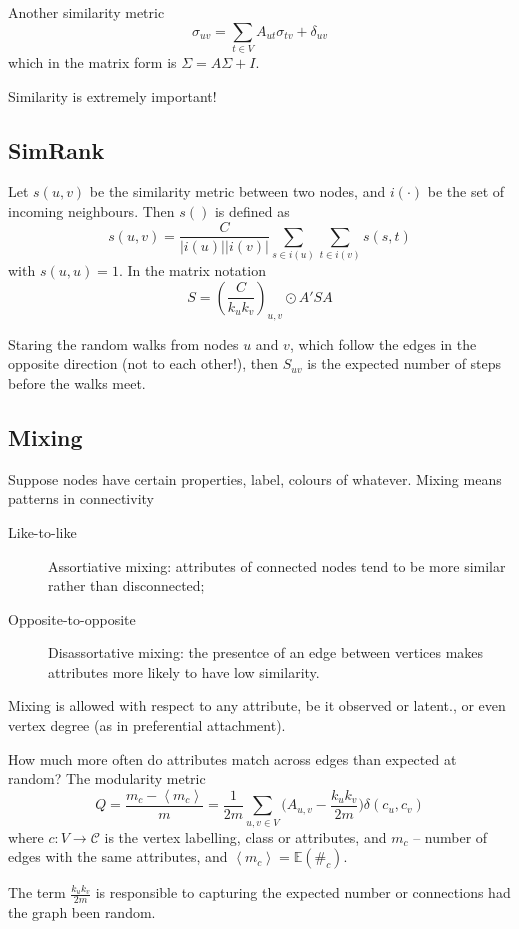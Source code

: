 \documentclass[a4paper]{article}
\newcommand{\brac}[1]{{\left ( #1 \right )}}
\newcommand{\abs}[1]{{\left | #1 \right |}}
\newcommand{\brkt}[1]{{\left\langle #1 \right\rangle}}
\newcommand{\ex}{\mathbb{E}}
\begin{document}
Another similarity metric
\[\sigma_{uv} = \sum_{t\in V} A_{ut}\sigma_{tv} + \delta_{uv}\]
which in the matrix form is $\Sigma = A \Sigma + I$.

Similarity is extremely important!

\subsection{SimRank} %
\label{sub:simrank}
Let $s(u,v)$ be the similarity metric between two nodes, and $i(\cdot)$ be the set of incoming neighbours. Then $s()$ is defined as 
\[ s(u,v) = \frac{C}{\abs{i(u)}\abs{i(v)}} \sum_{s\in i(u)} \sum_{t\in i(v)} s(s,t)\]
with $s(u,u)=1$. In the matrix notation
\[ S = \brac{\frac{C}{k_u k_v}}_{u,v}\odot A' S A\]

Staring the random walks from nodes $u$ and $v$, which follow the edges in the opposite direction (not to each other!), then $S_{uv}$ is the expected number of steps before the walks meet.


\subsection{Mixing} %
\label{sub:mixing}

Suppose nodes have certain properties, label, colours of whatever.
Mixing means patterns in connectivity
\begin{description}
	\item[Like-to-like] Assortiative mixing: attributes of connected nodes tend to be more similar rather than disconnected;
	\item[Opposite-to-opposite] Disassortative mixing: the presentce of an edge between vertices makes attributes more likely to have low similarity.
\end{description}

Mixing is allowed with respect to any attribute, be it observed or latent., or even vertex degree (as in preferential attachment).

How much more often do attributes match across edges than expected at random? The modularity metric
\[ Q = \frac{m_c-\brkt{m_c}}{m} = \frac{1}{2m}\sum_{u,v\in V} \Big( A_{u,v} - \frac{k_u k_v}{2m} \Big) \delta(c_u,c_v)\]
where $c:V\to \mathcal{C}$ is the vertex labelling, class or attributes, and $m_c$ -- number of edges with the same attributes, and $\brkt{m_c} =\ex(\#_c)$.

The term $\frac{k_u k_v}{2m}$ is responsible to capturing the expected number or connections had the graph been random.
\end{document}
